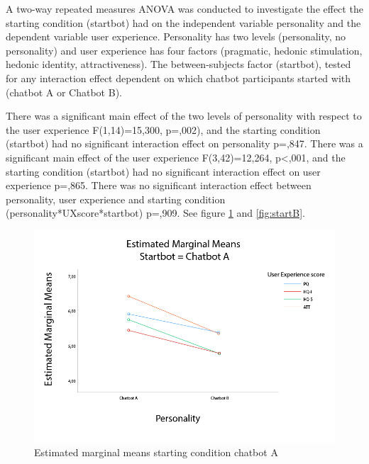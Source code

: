 A two-way repeated measures ANOVA was conducted to investigate the effect the starting condition (startbot) had on the independent variable personality and the dependent variable user experience. Personality has two levels (personality, no personality) and user experience has four factors (pragmatic, hedonic stimulation, hedonic identity, attractiveness). The between-subjects factor (startbot), tested for any interaction effect dependent on which chatbot participants started with (chatbot A or Chatbot B).

There was a significant main effect of the two levels of personality with respect to the user experience F(1,14)=15,300, p=,002), and the starting condition (startbot) had no significant interaction effect on personality p=,847. There was a significant main effect of the user experience F(3,42)=12,264, p<,001, and the starting condition (startbot) had no significant interaction effect on user experience p=,865. There was no significant interaction effect between personality, user experience and starting condition (personality*UXscore*startbot) p=,909. See figure \ref{fig:startA} and \ref{fig:startB}.

\begin{figure}[h]
    \centering
    \includegraphics[scale=0.4]{figures/MMeanStartbotA.png}
    \caption{Estimated marginal means starting condition chatbot A}
    \label{fig:startA}
\end{figure}

